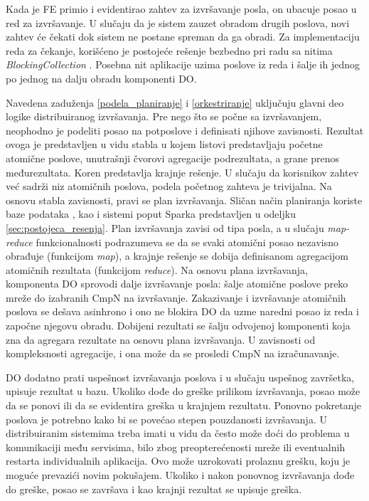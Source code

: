 \documentclass[12pt,oneside]{memoir}
\begin{document}
Kada je FE primio i evidentirao zahtev za izvršavanje posla, on ubacuje posao u red za izvršavanje. U slučaju da je sistem zauzet obradom drugih poslova, novi zahtev će čekati dok sistem ne postane spreman da ga obradi. Za implementaciju reda za čekanje, korišćeno je postojeće rešenje bezbedno pri radu sa nitima \emph{BlockingCollection} \cite{BlockingCollection}. Posebna nit aplikacije uzima poslove iz reda i šalje ih jednog po jednog na dalju obradu komponenti DO.

Navedena zaduženja \ref{podela_planiranje} i \ref{orkestriranje} uključuju glavni deo logike distribuiranog izvršavanja. Pre nego što se počne sa izvršavanjem, neophodno je podeliti posao na potposlove i definisati njihove zavisnosti. Rezultat ovoga je predstavljen u vidu stabla u kojem listovi predstavljaju početne atomične poslove, unutrašnji čvorovi agregacije podrezultata, a grane prenos međurezultata. Koren predstavlja krajnje rešenje. U slučaju da korisnikov zahtev već sadrži niz atomičnih poslova, podela početnog zahteva je trivijalna. Na osnovu stabla zavisnosti, pravi se plan izvršavanja. Sličan način planiranja koriste baze podataka \cite{SQLServerInternals}, kao i sistemi poput Sparka \cite{Spark} predstavljen u odeljku \ref{sec:postojeca_resenja}. Plan izvršavanja zavisi od tipa posla, a u slučaju \emph{map-reduce} funkcionalnosti podrazumeva se da se svaki atomični posao nezavisno obrađuje (funkcijom \emph{map}), a krajnje rešenje se dobija definisanom agregacijom atomičnih rezultata (funkcijom \emph{reduce}). Na osnovu plana izvršavanja, komponenta DO sprovodi dalje izvršavanje posla: šalje atomične poslove preko mreže do izabranih CmpN na izvršavanje. Zakazivanje i izvršavanje atomičnih poslova se dešava asinhrono i ono ne blokira DO da uzme naredni posao iz reda i započne njegovu obradu. Dobijeni rezultati se šalju odvojenoj komponenti koja zna da agregara rezultate na osnovu plana izvršavanja. U zavisnosti od kompleksnosti agregacije, i ona može da se prosledi CmpN na izračunavanje.

DO dodatno prati uspešnost izvršavanja poslova i u slučaju uspešnog završetka, upisuje rezultat u bazu. Ukoliko dođe do greške prilikom izvršavanja, posao može da se ponovi ili da se evidentira greška u krajnjem rezultatu. Ponovno pokretanje poslova je potrebno kako bi se povećao stepen pouzdanosti izvršavanja. U distribuiranim sistemima treba imati u vidu da često može doći do problema u komunikaciji među servisima, bilo zbog preopterećenosti mreže ili eventualnih restarta individualnih aplikacija. Ovo može uzrokovati prolaznu grešku, koju je moguće prevazići novim pokušajem. Ukoliko i nakon ponovnog izvršavanja dođe do greške, posao se završava i kao krajnji rezultat se upisuje greška.
\end{document}
